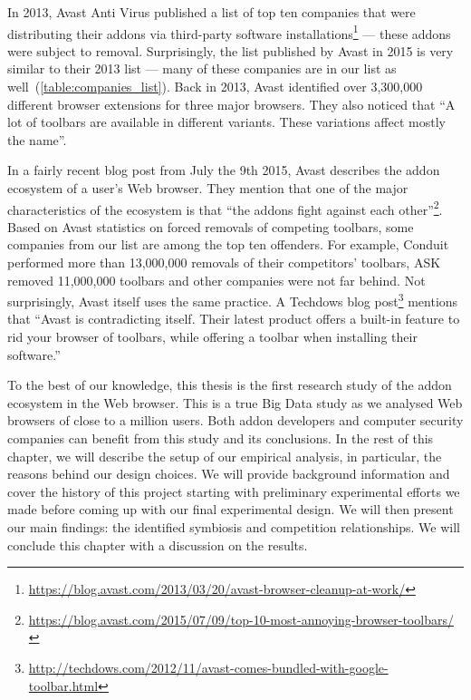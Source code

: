 \documentclass[11pt,oneside]{book}
\begin{document}
In 2013, Avast Anti Virus published a list of top ten companies that were distributing their addons via third-party software installations\footnote{\url{https://blog.avast.com/2013/03/20/avast-browser-cleanup-at-work/}} --- these addons were subject to removal. Surprisingly, the list published by Avast in 2015 is very similar to their 2013 list --- many of these companies are in our list as well~(\autoref{table:companies_list}). Back in 2013, Avast identified over 3,300,000 different browser extensions for three major browsers. They also noticed that ``A lot of toolbars are available in different variants. These variations affect mostly the name''. 

In a fairly recent blog post from July the 9th 2015, Avast describes the addon ecosystem of a user's Web browser. They mention that one of the major characteristics of the ecosystem is that ``the addons fight against each other''\footnote{\url{https://blog.avast.com/2015/07/09/top-10-most-annoying-browser-toolbars/}}.
Based on Avast statistics on forced removals of competing toolbars, some companies from our list are among the top ten offenders. For example, Conduit performed more than 13,000,000 removals of their competitors' toolbars, ASK removed 11,000,000 toolbars and other companies were not far behind. Not surprisingly, Avast itself uses the same practice. A Techdows blog post\footnote{\url{http://techdows.com/2012/11/avast-comes-bundled-with-google-toolbar.html}} mentions that ``Avast is contradicting itself. Their latest product offers a built-in feature to rid your browser of toolbars, while offering a toolbar when installing their software.''

To the best of our knowledge, this thesis is the first research study of the addon ecosystem in the Web browser. This is a true Big Data study as we analysed Web browsers of close to a million users. Both addon developers and computer security companies can benefit from this study and its conclusions. In the rest of this chapter, we will describe the setup of our empirical analysis, in particular, the reasons behind our design choices. We will provide background information and cover the history of this project starting with preliminary experimental efforts we made before coming up with our final experimental design. We will then present our main findings: the identified symbiosis and competition relationships. We will conclude this chapter with a discussion on the results.
\end{document}
